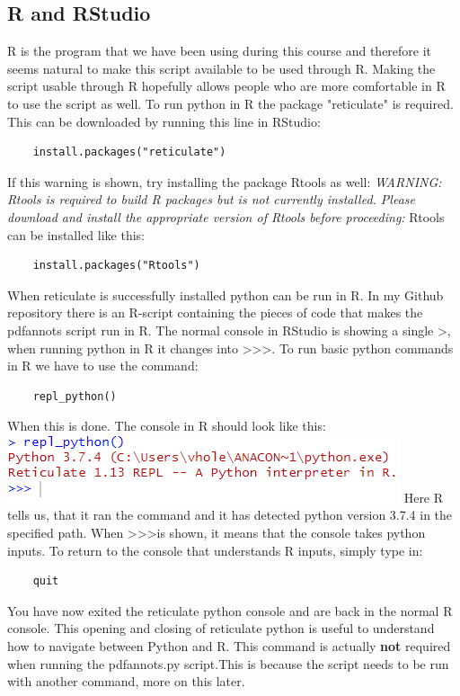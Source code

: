 \documentclass{article}
\begin{document}
\subsection{R and RStudio}
R is the program that we have been using during this course and therefore it seems natural to make this script available to be used through R. Making the script usable through R hopefully allows people who are more comfortable in R to use the script as well. To run python in R the package "reticulate" is required. This can be downloaded by running this line in RStudio:
\begin{verbatim}
    install.packages("reticulate")
\end{verbatim}
If this warning is shown, try installing the package Rtools as well: \textit{WARNING: Rtools is required to build R packages but is not currently installed. Please download and install the appropriate version of Rtools before proceeding:} Rtools can be installed like this:
\begin{verbatim}
    install.packages("Rtools")
\end{verbatim}
When reticulate is successfully installed python can be run in R. In my Github repository there is an R-script containing the pieces of code that makes the pdfannots script run in R. The normal console in RStudio is showing a single \textgreater, when running python in R it changes into \textgreater\textgreater\textgreater. To run basic python commands in R we have to use the command:
\begin{verbatim}
    repl_python()
\end{verbatim}
When this is done. The console in R should look like this: \newline
\includegraphics[scale=1]{repl_python.PNG} \newline
Here R tells us, that it ran the command and it has detected python version 3.7.4 in the specified path. When \textgreater\textgreater\textgreater is shown, it means that the console takes python inputs. To return to the console that understands R inputs, simply type in:
\begin{verbatim}
    quit
\end{verbatim}
You have now exited the reticulate python console and are back in the normal R console. This opening and closing of reticulate python is useful to understand how to navigate between Python and R. This command is actually \textbf{not} required when running the pdfannots.py script.This is because the script needs to be run with another command, more on this later.\newline
\end{document}
